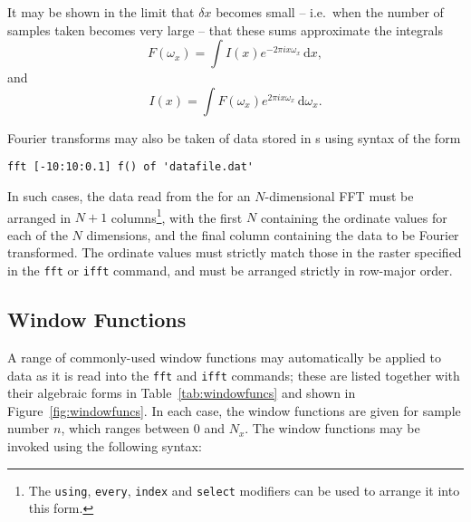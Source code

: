 It may be shown in the limit that $\delta x$ becomes small -- i.e.\ when the
number of samples taken becomes very large -- that these sums approximate the
integrals
\begin{equation}
F(\omega_x) = \int I(x) e^{-2\pi ix\omega_x} \,\mathrm{d}x ,
\end{equation}
\noindent and
\begin{equation}
I(x) = \int F(\omega_x) e^{ 2\pi ix\omega_x} \,\mathrm{d}\omega_x .
\end{equation}

Fourier transforms may also be taken of data stored in \datafile s using syntax
of the form
\begin{verbatim}
fft [-10:10:0.1] f() of 'datafile.dat'
\end{verbatim}

\noindent In such cases, the data read from the \datafile for an
$N$-dimensional FFT must be arranged in $N+1$ columns\footnote{The {\tt using},
{\tt every}, {\tt index} and {\tt select} modifiers can be used to arrange it
into this form.}, with the first $N$ containing the ordinate values for each of
the $N$ dimensions, and the final column containing the data to be Fourier
transformed. The ordinate values must strictly match those in the raster
specified in the {\tt fft} or {\tt ifft} command, and must be arranged strictly
in row-major order.


\subsection{Window Functions}

A range of commonly-used window functions may automatically be applied to data
as it is read into the {\tt fft} and {\tt ifft} commands; these are listed
together with their algebraic forms in Table~\ref{tab:windowfuncs} and shown in
Figure~\ref{fig:windowfuncs}. In each case, the window functions are given for
sample number $n$, which ranges between $0$ and $N_x$. The window functions may
be invoked using the following syntax:

